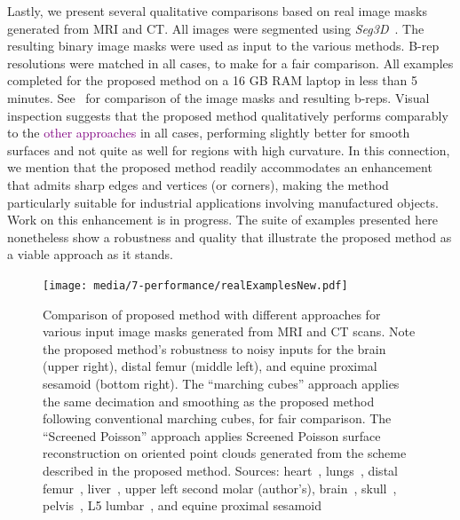 Lastly, we present several qualitative comparisons based on real image masks generated from MRI and CT.  All images were segmented using \textit{Seg3D}~\cite{Seg3D}. The resulting binary image masks were used as input to the various methods. B-rep resolutions were matched in all cases, to make for a fair comparison. All examples completed for the proposed method on a 16 GB RAM laptop in less than 5 minutes. See~ for comparison of the image masks and resulting b-reps. Visual inspection suggests that the proposed method qualitatively performs comparably to the \textcolor{purple}{other approaches} in all cases, performing slightly better for smooth surfaces and not quite as well for regions with high curvature. In this connection, we mention that the proposed method readily accommodates an enhancement that admits sharp edges and vertices (or corners), making the method particularly suitable for industrial applications involving manufactured objects.  Work on this enhancement is in progress.  The suite of examples presented here nonetheless show a robustness and quality that illustrate the proposed method as a viable approach as it stands.
%
\begin{figure}[h!]
	\centering
	 \texttt{[image: media/7-performance/realExamplesNew.pdf]}
	\caption{Comparison of proposed method with different approaches for various input image masks generated from MRI and CT scans. Note the proposed method's robustness to noisy inputs for the brain (upper right), distal femur (middle left), and equine proximal sesamoid (bottom right). The ``marching cubes'' approach applies the same decimation and smoothing as the proposed method following conventional marching cubes, for fair comparison. The ``Screened Poisson'' approach applies Screened Poisson surface reconstruction on oriented point clouds generated from the scheme described in the proposed method. Sources: heart~\cite{cvgg}, lungs~\cite{rikxoort_2009}, distal femur~\cite{epperson_2013}, liver~\cite{bilic_2019}, upper left second molar (author's), brain~\cite{marcus_2007}, skull~\cite{clark_2013}, pelvis~\cite{clark_2013}, L5 lumbar~\cite{yao_2016}, and equine proximal sesamoid~\cite{shaffer2021}}
	\label{fig:example-meshes}
\end{figure} \\
%
